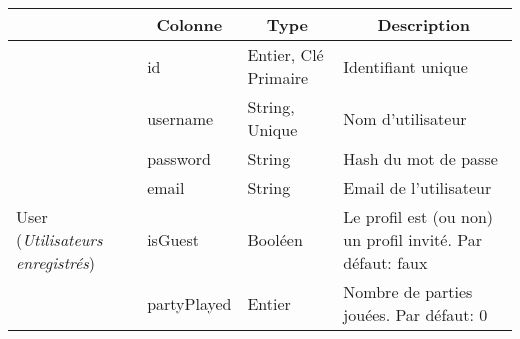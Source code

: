 \begin{longtable}[c]{@{}|p{}|p{}|p{}|p{}|@{}}
	\rowcolor{ccPurple} 
	\multicolumn{1}{|c|}{Table} & \multicolumn{1}{c|}{Colonne} & \multicolumn{1}{c|}{Type}                                        & \multicolumn{1}{c|}{Description}                                 \\
	\endhead
														& id                                                   & Entier, Clé Primaire                                                                     & Identifiant unique                                                                       \\* \cline{2-4} 
														& username                                             & String, Unique                                                                           & Nom d’utilisateur                                                                        \\* \cline{2-4} 
														& password                                             & String                                                                                   & Hash du mot de passe                                                                     \\* \cline{2-4} 
														& email                                                & String                                                                                   & Email de l’utilisateur                                                                   \\* \cline{2-4} 
	\multirow{-5}{0.18\textwidth}{User (\textit{Utilisateurs enregistrés})}								& isGuest                                              & Booléen                                                                                  & Le profil est (ou non) un profil invité. Par défaut: faux                                \\* \cline{2-4} 
							                            & partyPlayed                                          & Entier                                                                                   & Nombre de parties jouées. Par défaut: 0                                                  \\* \hline

\end{longtable}
